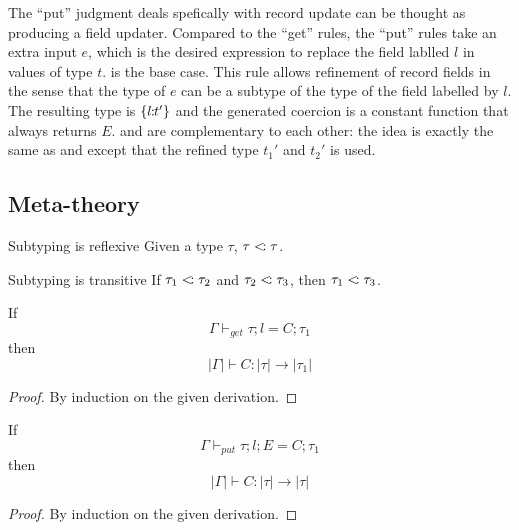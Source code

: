 \begin{itemize}
  The ``put'' judgment deals spefically with record update can be thought as
  producing a field updater. Compared to the ``get'' rules, the ``put'' rules
  take an extra input $ e $, which is the desired expression to replace the
  field lablled $ l $ in values of type $ t $.  is the base
  case. This rule allows refinement of record fields in the sense that the type
  of $ e $ can be a subtype of the type of the field labelled by $ l $. The
  resulting type is $ \{ l \!\!:\!\! t' \} $ and the generated coercion is a
  constant function that always returns $ E $.  and
   are complementary to each other: the idea is exactly the
  same as  and  except that the refined type
  $ t_1' $ and $ t_2' $ is used.

\end{itemize}

\subsection{Meta-theory}

\begin{lemma}{Subtyping is reflexive} \label{sub-refl}
Given a type $ \tau $, $ \tau <\!: \tau $.
\end{lemma}

\begin{lemma}{Subtyping is transitive} \label{sub-trans}
If $ \tau_1 <\!: \tau_2 $ and $ \tau_2 <\!: \tau_3$,
then $ \tau_1 <\!: \tau_3$.
\end{lemma}


\begin{lemma} \label{type-get}
  If $$ \Gamma \vdash_{get} \tau ; l = C ; \tau_1 $$
  then $$ |\Gamma| \vdash C : |\tau| \to |\tau_1| $$
\end{lemma}

\begin{proof}
By induction on the given derivation.
\end{proof}

\begin{lemma} \label{type-put}
  If $$ \Gamma \vdash_{put} \tau ; l ; E = C ; \tau_1 $$
  then $$ |\Gamma| \vdash C : |\tau| \to |\tau| $$
\end{lemma}

\begin{proof}
By induction on the given derivation.
\end{proof}


